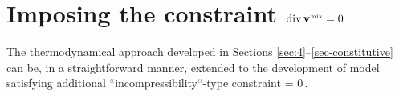 \documentclass[a4paper]{article}
\begin{document}
\section{Imposing the constraint $\mathop{\rm div}\nolimits{\bf v}^{\mbox{\tiny{mix}}} = 0$}
\label{sec-incompressible}
The thermodynamical approach developed in Sections \ref{sec:4}--\ref{sec-constitutive} can be, in a straightforward manner, extended to the development of model satisfying additional ``incompressibility``-type constraint
\be
\label{eq-incompressibility}
	\div\vvmix = 0\,. 
\ee
\end{document}
